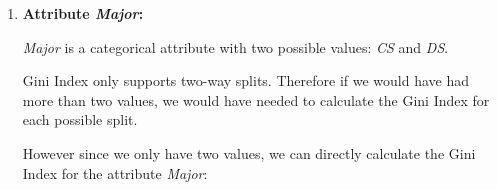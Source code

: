 \documentclass[
english,
smallborders
]{i6prcsht}
\begin{document}
\begin{solution}
\begin{enumerate}
\begin{enumerate}
\begin{enumerate}
				                  The best split point is $25,0$ since its Gini Index is the lowest ($0,4444$) and therefore the reduction of impurity ($0,0556$) is the highest.
				                  
				            \item \textbf{Attribute \textit{Major}:}
				                  
				                  \textit{Major} is a categorical attribute with two possible values: \textit{CS} and \textit{DS}.
				                  
				                  Gini Index only supports two-way splits. Therefore if we would have had more than two values, we would have needed to calculate the Gini Index for each possible split.
				                  
				                  However since we only have two values, we can directly calculate the Gini Index for the attribute \textit{Major}:
				                  

\end{enumerate}
\end{enumerate}
\end{enumerate}
\end{solution}
\end{document}
